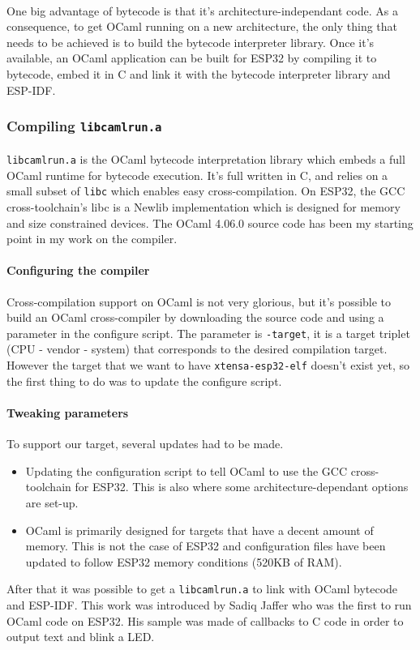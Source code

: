 \documentclass[a4paper]{article}
\begin{document}
\paragraph{}
One big advantage of bytecode is that it's architecture-independant code. As a consequence, to get OCaml running on a new architecture, the only thing that needs to be achieved is to build the bytecode interpreter library. Once it's available, an OCaml application can be built for ESP32 by compiling it to bytecode, embed it in C and link it with the bytecode interpreter library and ESP-IDF. 
\subsubsection{Compiling \texttt{libcamlrun.a}}
\paragraph{}
\texttt{libcamlrun.a} is the OCaml bytecode interpretation library which embeds a full OCaml runtime for bytecode execution. It's full written in C, and relies on a small subset of \texttt{libc} which enables easy cross-compilation. On ESP32, the GCC cross-toolchain's libc is a Newlib implementation which is designed for memory and size constrained devices. The OCaml 4.06.0 source code has been my starting point in my work on the compiler. 
\paragraph{Configuring the compiler}
Cross-compilation support on OCaml is not very glorious, but it's possible to build an OCaml cross-compiler by downloading the source code and using a parameter in the configure script. The parameter is \texttt{-target}, it is a target triplet (CPU - vendor - system) that corresponds to the desired compilation target. However the target that we want to have \texttt{xtensa-esp32-elf} doesn't exist yet, so the first thing to do was to update the configure script. 
\paragraph{Tweaking parameters}
To support our target, several updates had to be made. 
\begin{itemize}
\item Updating the configuration script to tell OCaml to use the GCC cross-toolchain for ESP32. This is also where some architecture-dependant options are set-up.
\item OCaml is primarily designed for targets that have a decent amount of memory. This is not the case of ESP32 and configuration files have been updated to follow ESP32 memory conditions (520KB of RAM).
\end{itemize}
After that it was possible to get a \texttt{libcamlrun.a} to link with OCaml bytecode and ESP-IDF. This work was introduced by Sadiq Jaffer who was the first to run OCaml code on ESP32. His sample was made of callbacks to C code in order to output text and blink a LED. 
\end{document}

